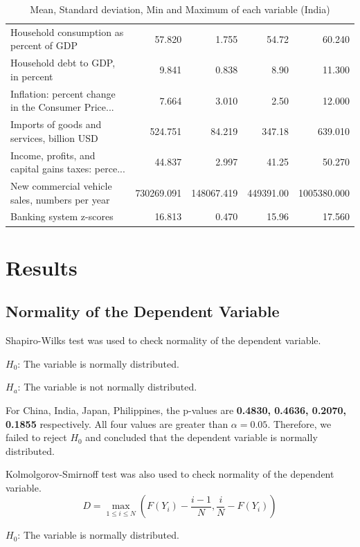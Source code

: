 \documentclass[11pt]{article}
\begin{document}
\begin{table}[H]
{\begin{tabular}{lrrrr}
Household consumption as percent of GDP            &      57.820 &       1.755 &      54.72 &       60.240 \\
Household debt to GDP, in percent                  &       9.841 &       0.838 &       8.90 &       11.300 \\
Inflation: percent change in the Consumer Price... &       7.664 &       3.010 &       2.50 &       12.000 \\
Imports of goods and services, billion USD         &     524.751 &      84.219 &     347.18 &      639.010 \\
Income, profits, and capital gains taxes: perce... &      44.837 &       2.997 &      41.25 &       50.270 \\
New commercial vehicle sales, numbers per year     &  730269.091 &  148067.419 &  449391.00 &  1005380.000 \\
Banking system z-scores                            &      16.813 &       0.470 &      15.96 &       17.560 \\
\bottomrule
\end{tabular}}
\caption{Mean, Standard deviation, Min and Maximum of each variable (India)}
\label{tab:describe_ind}
\end{table}

\section{Results}\label{results}
\subsection{Normality of the Dependent Variable}\label{normality_check}

Shapiro-Wilks test was used to check normality of the dependent variable.

$H_0$: The variable is normally distributed.

$H_a$: The variable is not normally distributed.

For China, India, Japan, Philippines, the p-values are \textbf{0.4830, 0.4636, 0.2070, 0.1855} respectively. All four values are greater than $\alpha=0.05$. Therefore, we failed to reject $H_0$ and concluded that the dependent variable is normally distributed.

Kolmolgorov-Smirnoff test was also used to check normality of the dependent variable.
$$D=\underset{1 \leq i \leq N}{\max}(F(Y_i)-\frac{i-1}{N},\frac{i}{N}-F(Y_i))$$

$H_0$: The variable is normally distributed.
\end{document}
